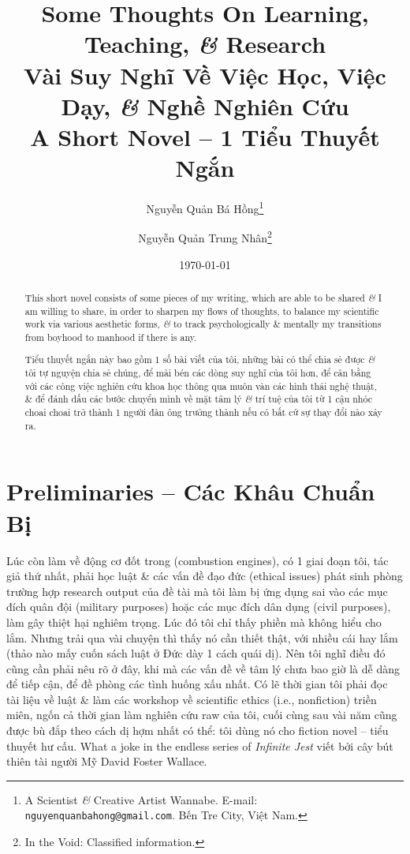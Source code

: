 \documentclass[12pt]{article}
\title{Some Thoughts On Learning, Teaching, {\it\&} Research\\Vài Suy Nghĩ Về Việc Học, Việc Dạy, {\it\&} Nghề Nghiên Cứu\\{\Large\sf A Short Novel -- 1 Tiểu Thuyết Ngắn}}
\author{Nguyễn Quản Bá Hồng\footnote{A Scientist {\it\&} Creative Artist Wannabe. E-mail: {\tt nguyenquanbahong@gmail.com}. Bến Tre City, Việt Nam.}\and Nguyễn Quản Trung Nhân\footnote{In the Void: Classified information.}}
\date{\today}
\begin{document}
\maketitle
\begin{abstract}
	This short novel consists of some pieces of my writing, which are able to be shared {\it\&} I am willing to share, in order to sharpen my flows of thoughts, to balance my scientific work via various aesthetic forms, {\it\&} to track psychologically \& mentally my transitions from boyhood to manhood if there is any.

	Tiểu thuyết ngắn này bao gồm 1 số bài viết của tôi, những bài có thể chia sẻ được {\it\&} tôi tự nguyện chia sẻ chúng, để mài bén các dòng suy nghĩ của tôi hơn, để cân bằng với các công việc nghiên cứu khoa học thông qua muôn vàn các hình thái nghệ thuật, \& để đánh dấu các bước chuyển mình về mặt tâm lý {\it\&} trí tuệ của tôi từ 1 cậu nhóc choai choai trở thành 1 người đàn ông trưởng thành nếu có bất cứ sự thay đổi nào xảy ra.
\end{abstract}
\setcounter{secnumdepth}{4}
\setcounter{tocdepth}{4}
\tableofcontents


\section{Preliminaries -- Các Khâu Chuẩn Bị}
Lúc còn làm về động cơ đốt trong (combustion engines), có 1 giai đoạn tôi, tác giả thứ nhất, phải học luật \& các vấn đề đạo đức (ethical issues) phát sinh phòng trường hợp research output của đề tài mà tôi làm bị ứng dụng sai vào các mục đích quân đội (military purposes) hoặc các mục đích dân dụng (civil purposes), làm gây thiệt hại nghiêm trọng. Lúc đó tôi chỉ thấy phiền mà không hiểu cho lắm. Nhưng trải qua vài chuyện thì thấy nó cần thiết thật, với nhiều cái hay lắm (thảo nào mấy cuốn sách luật ở Đức dày 1 cách quái dị). Nên tôi nghĩ điều đó cũng cần phải nêu rõ ở đây, khi mà các vấn đề về tâm lý chưa bao giờ là dễ dàng để tiếp cận, để đề phòng các tình huống xấu nhất. Có lẽ thời gian tôi phải đọc tài liệu về luật \& làm các workshop về scientific ethics (i.e., nonfiction) triền miên, ngốn cả thời gian làm nghiên cứu raw của tôi, cuối cùng sau vài năm cũng được bù đắp theo cách dị hợm nhất có thể: tôi dùng nó cho fiction novel -- tiểu thuyết hư cấu. What a joke in the endless series of {\it Infinite Jest} \cite{Wallace_jest} viết bởi cây bút thiên tài người Mỹ {\sc David Foster Wallace}.
\end{document}
